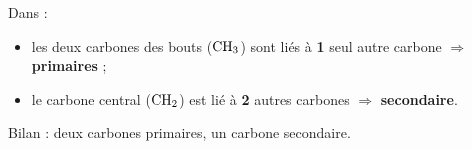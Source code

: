 \documentclass[11pt,a4paper]{article}
\begin{document}
\begin{corrige}
Dans  :
\begin{itemize}[leftmargin=1.6em,itemsep=1pt]
  \item les deux carbones des bouts ($\ce{CH3}$) sont liés à \textbf{1} seul autre carbone $\Rightarrow$ \textbf{primaires} ;
  \item le carbone central ($\ce{CH2}$) est lié à \textbf{2} autres carbones $\Rightarrow$ \textbf{secondaire}.
\end{itemize}
Bilan : deux carbones primaires, un carbone secondaire.
\end{corrige}
\end{document}
